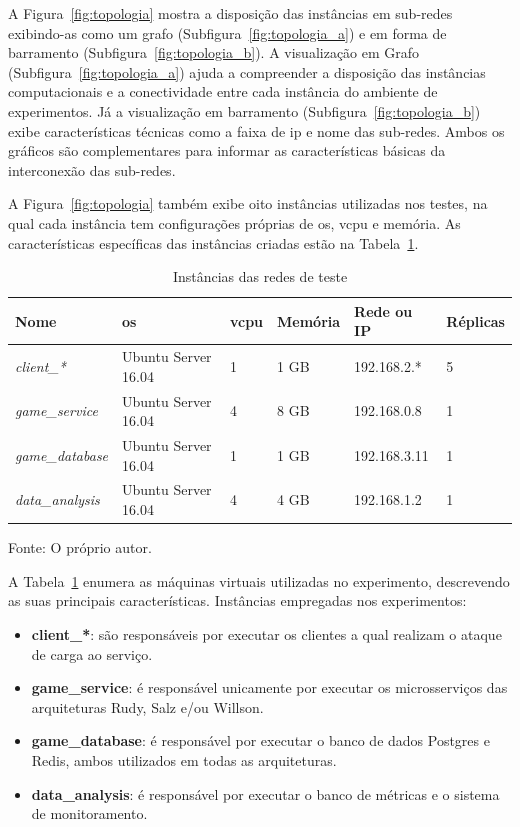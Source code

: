 A Figura~\ref{fig:topologia} mostra a disposição das instâncias em sub-redes exibindo-as como um grafo (Subfigura~\ref{fig:topologia_a}) e em forma de barramento (Subfigura~\ref{fig:topologia_b}).
%
A visualização em Grafo (Subfigura~\ref{fig:topologia_a}) ajuda a compreender a disposição das instâncias computacionais e a conectividade entre cada instância do ambiente de experimentos.
%
Já a visualização em barramento (Subfigura~\ref{fig:topologia_b}) exibe características técnicas como a faixa de \ac{ip} e nome das sub-redes.
%
Ambos os gráficos são complementares para informar as características básicas da interconexão das sub-redes.

A Figura~\ref{fig:topologia} também exibe oito instâncias utilizadas nos testes, na qual cada instância tem configurações próprias de \ac{os}, \acs{vcpu} e memória.
%
As características específicas das instâncias criadas estão na Tabela~\ref{tab:instancias}.

\begin{table}[htb!]
    \centering
    \caption{Instâncias das redes de teste}
    \label{tab:instancias}
    \begin{tabular}{|l|l|l|l|l|l|}
        \hline
        Nome                    & \ac{os}             &\acs{vcpu}& Memória & Rede ou IP   & Réplicas \\ \hline
        \textit{client\_*}      & Ubuntu Server 16.04 & 1        & 1 GB    & 192.168.2.*  & 5        \\ \hline
        \textit{game\_service}  & Ubuntu Server 16.04 & 4        & 8 GB    & 192.168.0.8  & 1        \\ \hline
        \textit{game\_database} & Ubuntu Server 16.04 & 1        & 1 GB    & 192.168.3.11 & 1        \\ \hline
        \textit{data\_analysis} & Ubuntu Server 16.04 & 4        & 4 GB    & 192.168.1.2  & 1        \\ \hline
    \end{tabular}

    Fonte: O próprio autor.
\end{table}

A Tabela~\ref{tab:instancias} enumera as máquinas virtuais utilizadas no experimento, descrevendo as suas principais características.
%
Instâncias empregadas nos experimentos:

\begin{itemize}
    \item \textbf{client\_*}: são responsáveis por executar os clientes a qual realizam o ataque de carga ao serviço.
    \item \textbf{game\_service}: é responsável unicamente por executar os microsserviços das arquiteturas Rudy, Salz e/ou Willson.
    \item \textbf{game\_database}: é responsável por executar o banco de dados Postgres e Redis, ambos utilizados em todas as arquiteturas.
    \item \textbf{data\_analysis}: é responsável por executar o banco de métricas e o sistema de monitoramento.
\end{itemize}

